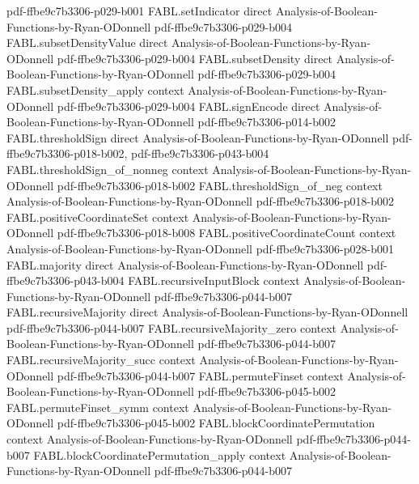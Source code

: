 \begin{theorem}
  {pdf-ffbe9c7b3306-p029-b001}
\proofstep
  {FABL.setIndicator}
  {direct}
  {Analysis-of-Boolean-Functions-by-Ryan-ODonnell}
  {pdf-ffbe9c7b3306-p029-b004}
\proofstep
  {FABL.subsetDensityValue}
  {direct}
  {Analysis-of-Boolean-Functions-by-Ryan-ODonnell}
  {pdf-ffbe9c7b3306-p029-b004}
\proofstep
  {FABL.subsetDensity}
  {direct}
  {Analysis-of-Boolean-Functions-by-Ryan-ODonnell}
  {pdf-ffbe9c7b3306-p029-b004}
\proofstep
  {FABL.subsetDensity_apply}
  {context}
  {Analysis-of-Boolean-Functions-by-Ryan-ODonnell}
  {pdf-ffbe9c7b3306-p029-b004}
\proofstep
  {FABL.signEncode}
  {direct}
  {Analysis-of-Boolean-Functions-by-Ryan-ODonnell}
  {pdf-ffbe9c7b3306-p014-b002}
\proofstep
  {FABL.thresholdSign}
  {direct}
  {Analysis-of-Boolean-Functions-by-Ryan-ODonnell}
  {pdf-ffbe9c7b3306-p018-b002,
    pdf-ffbe9c7b3306-p043-b004}
\proofstep
  {FABL.thresholdSign_of_nonneg}
  {context}
  {Analysis-of-Boolean-Functions-by-Ryan-ODonnell}
  {pdf-ffbe9c7b3306-p018-b002}
\proofstep
  {FABL.thresholdSign_of_neg}
  {context}
  {Analysis-of-Boolean-Functions-by-Ryan-ODonnell}
  {pdf-ffbe9c7b3306-p018-b002}
\proofstep
  {FABL.positiveCoordinateSet}
  {context}
  {Analysis-of-Boolean-Functions-by-Ryan-ODonnell}
  {pdf-ffbe9c7b3306-p018-b008}
\proofstep
  {FABL.positiveCoordinateCount}
  {context}
  {Analysis-of-Boolean-Functions-by-Ryan-ODonnell}
  {pdf-ffbe9c7b3306-p028-b001}
\proofstep
  {FABL.majority}
  {direct}
  {Analysis-of-Boolean-Functions-by-Ryan-ODonnell}
  {pdf-ffbe9c7b3306-p043-b004}
\proofstep
  {FABL.recursiveInputBlock}
  {context}
  {Analysis-of-Boolean-Functions-by-Ryan-ODonnell}
  {pdf-ffbe9c7b3306-p044-b007}
\proofstep
  {FABL.recursiveMajority}
  {direct}
  {Analysis-of-Boolean-Functions-by-Ryan-ODonnell}
  {pdf-ffbe9c7b3306-p044-b007}
\proofstep
  {FABL.recursiveMajority_zero}
  {context}
  {Analysis-of-Boolean-Functions-by-Ryan-ODonnell}
  {pdf-ffbe9c7b3306-p044-b007}
\proofstep
  {FABL.recursiveMajority_succ}
  {context}
  {Analysis-of-Boolean-Functions-by-Ryan-ODonnell}
  {pdf-ffbe9c7b3306-p044-b007}
\proofstep
  {FABL.permuteFinset}
  {context}
  {Analysis-of-Boolean-Functions-by-Ryan-ODonnell}
  {pdf-ffbe9c7b3306-p045-b002}
\proofstep
  {FABL.permuteFinset_symm}
  {context}
  {Analysis-of-Boolean-Functions-by-Ryan-ODonnell}
  {pdf-ffbe9c7b3306-p045-b002}
\proofstep
  {FABL.blockCoordinatePermutation}
  {context}
  {Analysis-of-Boolean-Functions-by-Ryan-ODonnell}
  {pdf-ffbe9c7b3306-p044-b007}
\proofstep
  {FABL.blockCoordinatePermutation_apply}
  {context}
  {Analysis-of-Boolean-Functions-by-Ryan-ODonnell}
  {pdf-ffbe9c7b3306-p044-b007}
\proofstep

\end{theorem}
